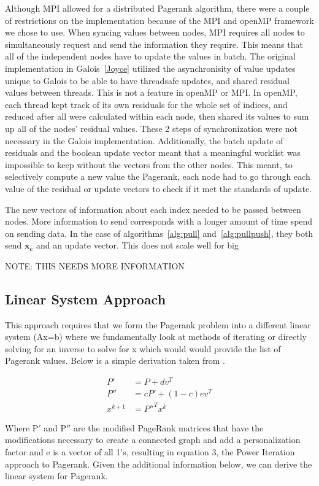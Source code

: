 \documentclass[letterpaper,12pt,onecolumn]{article}
\begin{document}
Although MPI allowed for a distributed Pagerank algorithm, there were a couple of restrictions on the implementation because of the MPI and openMP framework we chose to use. When syncing values between nodes, MPI requires all nodes to simultaneously request and send the information they require. This means that all of the independent nodes have to update the values in batch. The original implementation in Galois~\ref{Joyce} utilized the asynchronisity of value updates unique to Galois to be able to have threadsafe updates, and shared residual values between threads. This is not a feature in openMP or MPI. In openMP, each thread kept track of its own residuals for the whole set of indices, and reduced after all were calculated within each node, then shared its values to sum up all of the nodes' residual values. These 2 steps of synchronization were not necessary in the Galois implementation. Additionally, the batch update of residuals and the boolean update vector meant that a meaningful worklist was impossible to keep without the vectors from the other nodes. This meant, to selectively compute a new value the Pagerank, each node had to go through each value of the residual or update vectors to check if it met the standards of update. 

The new vectors of information about each index needed to be passed between nodes. More information to send corresponds with a longer amount of time spend on sending data. In the case of algorithms~\ref{alg:pull} and~\ref{alg:pullpush}, they both send $\mathbf{x_c}$ and an update vector. This does not scale well for big 

NOTE: THIS NEEDS MORE INFORMATION 

\subsection{Linear System Approach}
This approach requires that we form the Pagerank problem into a different linear system (Ax=b) where we fundamentally look at methods of iterating or directly solving for an inverse to solve for x which would would provide the list of Pagerank values. Below is a simple derivation taken from \cite{FastParallel}.
\begin{center}
\begin{align}
	P' &= P + dv^{T} \\
	P'' &= cP' + (1-c)ev^{T} \\
	x^{k+1} &= P''^{T}x^{k}
\end{align}

\end{center}
Where P$'$ and P$''$ are the modified PageRank matrices that have the modifications necessary to create a connected graph and add a personalization factor and e is a vector of all 1's, resulting in equation 3, the Power Iteration approach to Pagerank.
\newline
\linebreak
Given the additional information below, we can derive the linear system for Pagerank.
\end{document}
